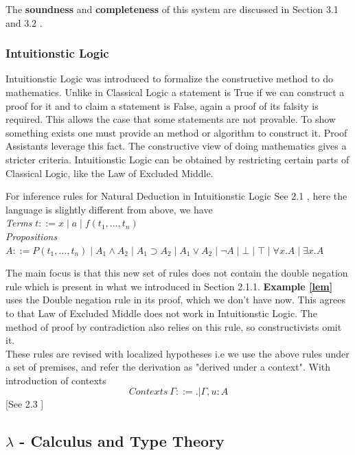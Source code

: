\documentclass[12pt]{article}
\begin{document}
The \textbf{soundness} and \textbf{completeness} of this system are discussed in Section 3.1 and 3.2 \cite{Alrubyli2021}. 
\subsubsection{Intuitionstic Logic}
Intuitionstic Logic was introduced to formalize the constructive method to do mathematics. Unlike in Classical Logic a statement is True if we can construct a proof for it and to claim a statement is False, again a proof of its falsity is required. This allows the case that some statements are not provable. 
To show something exists one must provide an method or algorithm to construct it. Proof Assistants leverage this fact.
The constructive view of doing mathematics gives a stricter criteria. Intuitionstic  Logic can be obtained by restricting certain parts of Classical Logic, like the Law of Excluded Middle.

For inference rules for Natural Deduction in Intuitionstic Logic See 2.1 \cite{Pfenning2004}, here the language is slightly different from above, we have
\\
\textit{Terms} \quad $t ::= x \mid a \mid f(t_1, \ldots, t_n)$
\\
\textit{Propositions} \quad
$A ::= P(t_1, \ldots, t_n) \mid A_1 \land A_2 \mid A_1 \supset A_2 \mid A_1 \lor A_2 \mid \neg A \mid \bot \mid \top \mid \forall x. A \mid \exists x. A$

 The main focus is that this new set of rules does not contain the double negation rule which is present in what we introduced in Section 2.1.1. \textbf {Example \ref{lem}} uses the Double negation rule in its proof, which we don't have now. This agrees to that Law of Excluded Middle does not work in Intuitionstic Logic. The method of proof by contradiction also relies on this rule, so constructivists omit it.\\
These rules are revised with localized hypotheses i.e we use the above rules under a set of premises, and refer the derivation as "derived under a context". With introduction of contexts 
$$Contexts  \ \Gamma ::= .|\Gamma,u: A$$
[See 2.3 \cite{Pfenning2004}]


\subsection{$\lambda$ - Calculus and Type Theory} 
\end{document}
